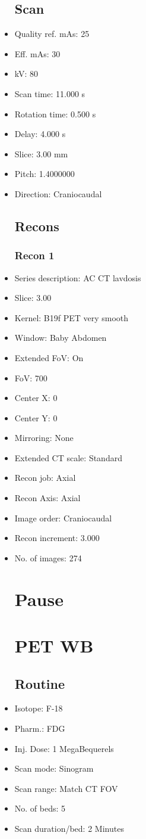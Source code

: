 \documentclass[12pt]{article}
\begin{document}
\begin{itemize}
\subsection{Scan}
\item Quality ref. mAs: 25\item Eff. mAs: 30\item kV: 80\item Scan time: 11.000 s\item Rotation time: 0.500 s\item Delay: 4.000 s\item Slice: 3.00 mm\item Pitch: 1.4000000\item Direction: Craniocaudal\subsection{Recons}

\subsubsection{Recon 1}
\item Series description: AC CT lavdosis
\item Slice: 3.00
\item Kernel: B19f PET very smooth
\item Window: Baby Abdomen
\item Extended FoV: On
\item FoV: 700
\item Center X: 0
\item Center Y: 0
\item Mirroring: None
\item Extended CT scale: Standard
\item Recon job: Axial
\item Recon Axis: Axial
\item Image order: Craniocaudal
\item Recon increment: 3.000
\item No. of images: 274
\section{Pause}
\section{PET WB}\subsection{Routine}
\item Isotope: F-18
\item Pharm.: FDG
\item Inj. Dose: 1 MegaBequerels
\item Scan mode: Sinogram
\item Scan range: Match CT FOV
\item No. of beds: 5
\item Scan duration/bed: 2 Minutes

\end{itemize}
\end{document}
